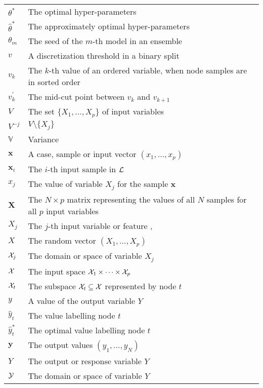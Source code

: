\begin{tabularx}{\textwidth}{ l X }
$\theta^*$ & The optimal hyper-parameters \dotfill  \pageref{ntn:theta-star}\\
$\widehat{\theta}^*$ & The approximately optimal hyper-parameters \dotfill  \pageref{ntn:theta-star-approx}\\
$\theta_m$ & The seed of the $m$-th model in an ensemble \dotfill  \pageref{ntn:theta-seed-m}\\
$v$ & A discretization threshold in a binary split \dotfill  \pageref{ntn:v}\\
$v_k$ & The $k$-th value of an ordered variable, when node samples are in sorted order \dotfill  \pageref{ntn:v_k}\\
$v_k^\prime$ & The mid-cut point between $v_k$ and $v_{k+1}$ \dotfill  \pageref{ntn:v_k_prime}\\
$V$ & The set $\{X_1, \dots, X_p\}$ of input variables \dotfill  \pageref{ntn:V}\\
$V^{-j}$ & $V \setminus \{X_j\}$ \dotfill  \pageref{ntn:V-j}\\
$\mathbb{V}$ & Variance \dotfill \\
$\textbf{x}$ & A case, sample or input vector $(x_1, \dots, x_p)$ \dotfill  \pageref{ntn:sample-x}\\
$\textbf{x}_i$ & The $i$-th input sample in ${\cal L}$ \dotfill  \pageref{ntn:sample-x_i}\\
$x_j$ & The value of variable $X_j$ for the sample $\textbf{x}$ \dotfill  \pageref{ntn:value-x_j}\\
$\textbf{X}$ & The $N\times p$ matrix representing the values of all $N$ samples for all $p$ input variables \dotfill  \pageref{ntn:matrix-X}\\
$X_j$ & The $j$-th input variable or feature \dotfill  \pageref{ntn:var-X_j}, \pageref{ntn:var-X_j2}\\
$X$ & The random vector $(X_1,\dots,X_p)$ \dotfill  \pageref{ntn:vector-X}\\
${\cal X}_j$ & The domain or space of variable $X_j$ \dotfill  \pageref{ntn:space-X_j}\\
${\cal X}$ & The input space ${\cal X}_1 \times \dots \times {\cal X}_p$ \dotfill  \pageref{ntn:space-X}\\
${\cal X}_t$ & The subspace ${\cal X}_t \subseteq {\cal X}$ represented by node $t$ \dotfill  \pageref{ntn:node-space}\\
$y$ & A value of the output variable $Y$ \dotfill  \pageref{ntn:value-y}\\
$\widehat{y}_t$ & The value labelling node $t$ \dotfill  \pageref{ntn:y_t}\\
$\widehat{y}_t^*$ & The optimal value labelling node $t$ \dotfill  \pageref{ntn:y_t-star}\\
$\mathbf{y}$ & The output values $(y_1,\dots,y_N)$ \dotfill  \pageref{ntn:vector-y}\\
$Y$ & The output or response variable $Y$ \dotfill  \pageref{ntn:var-Y}\\
${\cal Y}$ & The domain or space of variable $Y$ \dotfill  \pageref{ntn:space-Y}\\
\end{tabularx}
